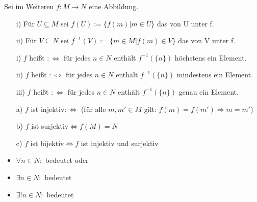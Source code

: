 \noindent Sei im Weiteren $f:M\rightarrow N$ eine Abbildung.
\begin{defi}
	\begin{itemize}
		\item[]
		\item[i)] Für $U\subseteq M$ sei $f(U):=\{f(m)|m\in U\}$ das  von U unter f.
		\item[ii)] Für $V\subseteq N$ sei $f^{-1}(V):=\{m\in M|f(m)\in V\}$ das  von V unter f.
	\end{itemize}
\end{defi}

\begin{defi}
	\begin{itemize}
		\item[]
		\item[i)] $f$ heißt  $:\Leftrightarrow$ für jedes $n\in N$ enthält $f^{-1}(\{n\})$ höchstens ein Element.
		\item[ii)] $f$ heißt  $:\Leftrightarrow$ für jedes $n\in N$ enthält $f^{-1}(\{n\})$ mindestens ein Element.
		\item[iii)] $f$ heißt  $:\Leftrightarrow$ für jedes $n\in N$ enthält $f^{-1}(\{n\})$ genau ein Element.
	\end{itemize}
\end{defi}

\begin{lem}
	\begin{itemize}
		\item[]
		\item[a)] $f$ ist injektiv$:\Leftrightarrow$ (für alle $m,m'\in M$ gilt: $f(m)=f(m')\Rightarrow m=m'$)
		\item[b)] $f$ ist surjektiv$\Leftrightarrow f(M)=N$
		\item[c)] $f$ ist bijektiv$\Leftrightarrow f$ ist injektiv und surjektiv
	\end{itemize}
\end{lem}

\begin{nota}
	\begin{itemize}
		\item[]
		\item $\forall n\in N:$ bedeutet  oder 
		\item $\exists n\in N:$ bedeutet 
		\item $\exists!n\in N:$ bedeutet 
	\end{itemize}
\end{nota}

